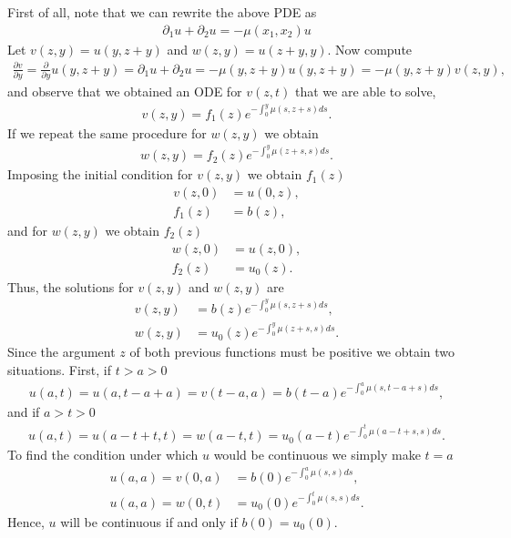 \begin{questions}


\begin{solution}
First of all, note that we can rewrite the above PDE as
\begin{align*}
\partial_1u+\partial_2u=-\mu (x_1,x_2)u
\end{align*}
Let $v(z,y)=u(y,z+y)$ and $w(z,y)=u(z+y,y)$. Now compute
\begin{align*}
\frac{\partial v}{\partial y}=\frac{\partial}{\partial y}u(y,z+y)=\partial_1u+\partial_2u=-\mu (y,z+y)u(y,z+y)=-\mu(y,z+y)v(z,y),
\end{align*}
and observe that we obtained an ODE for $v(z,t)$ that we are able to solve,
\begin{align*}
v(z,y)=f_1(z)e^{-\int_0^y\mu (s,z+s)ds}.
\end{align*}
If we repeat the same procedure for $w(z,y)$ we obtain
\begin{align*}
w(z,y)=f_2(z)e^{-\int_0^y\mu (z+s,s)ds}.
\end{align*}
Imposing the initial condition for $v(z,y)$ we obtain $f_1(z)$
\begin{align*}
v(z,0)&=u(0,z),\\
f_1(z)&=b(z),
\end{align*}
and for $w(z,y)$ we obtain $f_2(z)$
\begin{align*}
w(z,0)&=u(z,0),\\
f_2(z)&=u_0(z).
\end{align*}
Thus, the solutions for $v(z,y)$ and $w(z,y)$ are
\begin{align*}
v(z,y)&=b(z)e^{-\int_0^y\mu (s,z+s)ds},\\
w(z,y)&=u_0(z)e^{-\int_0^y\mu (z+s,s)ds}.
\end{align*}
Since the argument $z$ of both previous functions must be positive we obtain two situations. First, if $t>a>0$
\begin{align*}
u(a,t)=u(a,t-a+a)=v(t-a,a)=b(t-a)e^{-\int_0^a\mu (s,t-a+s)ds},
\end{align*}
and if $a>t>0$
\begin{align*}
u(a,t)=u(a-t+t,t)=w(a-t,t)=u_0(a-t)e^{-\int_0^t\mu (a-t+s,s)ds}.
\end{align*}
To find the condition under which $u$ would be continuous we simply make $t=a$
\begin{align*}
u(a,a)=v(0,a)&=b(0)e^{-\int_0^a\mu (s,s)ds},\\
u(a,a)=w(0,t)&=u_0(0)e^{-\int_0^t\mu (s,s)ds}.
\end{align*}
Hence, $u$ will be continuous if and only if $b(0)=u_0(0)$.
\end{solution}
\end{questions}
